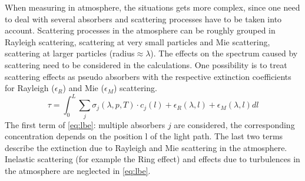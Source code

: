 \documentclass  [
  paper    = a4,
  BCOR     = 10mm,
  twoside,
  fontsize = 12pt,
  fleqn,
  toc      = bibnumbered,
  toc      = listofnumbered,
  numbers  = noendperiod,
  headings = normal,
  listof   = leveldown,
  version  = 3.03
]                                       {scrreprt}
\begin{document}
	When measuring in atmosphere, the situations gets more complex, since one need to deal with several absorbers and scattering processes have to be taken into account. 
	Scattering processes in the atmosphere can be roughly grouped in Rayleigh scattering, scattering at very small particles and Mie scattering, scattering at larger particles (radius$\approx \lambda$). The effects on the spectrum caused by scattering need to be considered in the calculations.  One possibility is to treat scattering effects as pseudo absorbers with the respective extinction coefficients for Rayleigh ($\epsilon_R$) and  Mie ($\epsilon_M$) scattering. 
	\begin{equation}
	\tau = \int^{L}_{0}\sum_{j}\sigma_{j}\left(\lambda,p,T\right)\cdot
	c_{j}\left(l\right)+\epsilon_R\left(\lambda,l\right)+\epsilon_{M}\left(\lambda,l\right)dl
	\label{eq:lbe}
	\end{equation}
	The first term of \cref{eq:lbe}: multiple absorbers $j$ are considered, the corresponding concentration depends on the position l of the light path.
	The last two terms describe the extinction due to Rayleigh and Mie scattering in the atmosphere.\\
	Inelastic scattering (for example the Ring effect) and effects due to turbulences in the atmosphere are neglected in \cref{eq:lbe}. 
\end{document}

